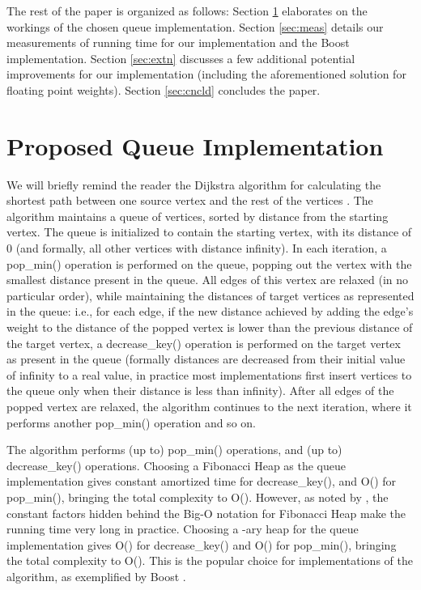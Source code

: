 \documentclass[conference,10pt,twocolumn]{IEEEtran}
\begin{document}
The rest of the paper is organized as follows: Section \ref{sec:Qimpl} elaborates on the workings of the chosen queue implementation. Section \ref{sec:meas} details our measurements of running time for our implementation and the Boost implementation. Section \ref{sec:extn} discusses a few additional potential improvements for our implementation (including the aforementioned solution for floating point weights). Section \ref{sec:cncld} concludes the paper.

\section{Proposed Queue Implementation}  \label{sec:Qimpl}

We will briefly remind the reader the Dijkstra algorithm for calculating the shortest path between one source vertex and the rest of the vertices \cite{Cormen90}.
The algorithm maintains a queue of vertices, sorted by distance from the starting vertex. The queue is initialized to contain the starting vertex, with its distance of 0 (and formally, all other vertices with distance infinity). In each iteration, a pop\_min() operation is performed on the queue, popping out the vertex with the smallest distance present in the queue. All edges of this vertex are relaxed (in no particular order), while maintaining the distances of target vertices as represented in the queue: i.e., for each edge, if the new distance achieved by adding the edge's weight to the distance of the popped vertex is lower than the previous distance of the target vertex, a decrease\_key() operation is performed on the target vertex as present in the queue (formally distances are decreased from their initial value of infinity to a real value, in practice most implementations first insert vertices to the queue only when their distance is less than infinity). After all edges of the popped vertex are relaxed, the algorithm continues to the next iteration, where it performs another pop\_min() operation and so on.

The algorithm performs (up to)  pop\_min() operations, and (up to)  decrease\_key() operations. Choosing a Fibonacci Heap as the queue implementation gives constant amortized time for decrease\_key(), and O() for pop\_min(), bringing the total complexity to O(). However, as noted by \cite[Ch.\ 21]{Cormen90}, the constant factors hidden behind the Big-O notation for Fibonacci Heap make the running time very long in practice. Choosing a -ary heap for the queue implementation gives O() for decrease\_key() and O() for pop\_min(), bringing the total complexity to O(). This is the popular choice for implementations of the algorithm, as exemplified by Boost \cite{Boost}.
\end{document}
